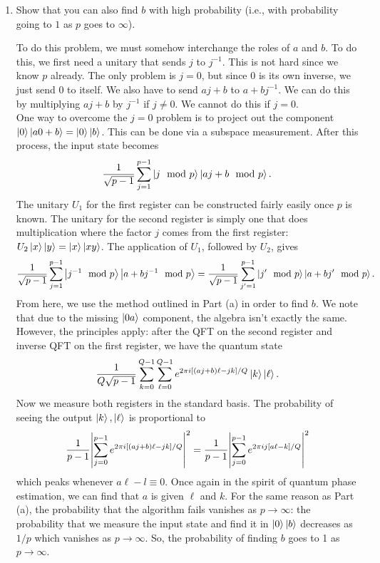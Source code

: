 \documentclass{article}
\theoremstyle{definition}
\newcommand{\f}[2]{\frac{#1}{#2}}
\begin{document}
\begin{enumerate}[label=(\alph*)]
\item Show that you can also find $b$ with high probability (i.e., with probability going to $1$ as $p$ goes to $\infty$). 

\noindent To do this problem, we must somehow interchange the roles of $a$ and $b$. To do this, we first need a unitary that sends $j$ to $j^{-1}$. This is not hard since we know $p$ already. The only problem is $j=0$, but since 0 is its own inverse, we just send $0$ to itself. We also have to send $aj+b$ to $a + bj^{-1}$. We can do this by multiplying $aj+b$ by $j^{-1}$ if $j\neq 0$. We cannot do this if $j=0$. \\

One way to overcome the $j=0$ problem is to project out the component $\ket{0} \ket{a 0 + b} = \ket{0}\ket{b}$. This can be done via a subspace measurement. After this process, the input state becomes
\begin{align*}
	\f{1}{\sqrt{p-1}}\sum_{j=1}^{p-1} \ket{j \mod p} \ket{aj + b \mod p}.
\end{align*}
The unitary $U_1$ for the first register can be constructed fairly easily once $p$ is known. The unitary for the second register is simply one that does multiplication where the factor $j$ comes from the first register: $U_2 \ket{x}\ket{y}= \ket{x}\ket{xy}$.  The application of $U_1$, followed by $U_2$, gives
\begin{align*}
		\f{1}{\sqrt{p-1}}\sum_{j=1}^{p-1} \ket{j^{-1} \mod p} \ket{a + b j^{-1} \mod p} = \f{1}{\sqrt{p-1}}\sum_{j'=1}^{p-1} \ket{j' \mod p} \ket{a + b j' \mod p}.
\end{align*}
From here, we use the method outlined in Part (a) in order to find $b$. We note that due to the missing $\ket{0a}$ component, the algebra isn't exactly the same. However, the principles apply: after the QFT on the second register and inverse QFT on the first register, we have the quantum state
\begin{align*}
	\f{1}{Q\sqrt{p-1}} \sum_{k=0}^{Q-1} \sum_{\ell = 0}^{Q-1} e^{2\pi i [(aj+b)\ell - jk]/Q} \ket{k} \ket{\ell}.
\end{align*}
Now we measure both registers in the standard basis. The probability of seeing the output $\ket{k}, \ket{\ell}$ is proportional to 
\begin{align*}
	\f{1}{p-1}\abs{\sum_{j=0}^{p-1} e^{2\pi i [ (aj+b)\ell - jk]  /Q }}^2 =  \f{1}{p-1}	\abs{\sum_{j=0}^{p-1} e^{2\pi i j [ a\ell - k]  /Q }}^2
\end{align*}
which peaks whenever $a\ell - l \equiv 0$. Once again in the spirit of quantum phase estimation, we can find that $a$ is given $\ell$ and $k$. For the same reason as Part (a), the probability that the algorithm fails vanishes as $p\to \infty$: the probability that we measure the input state and find it in $\ket{0}\ket{b}$ decreases as $1/p$ which vanishes as $p\to \infty$. So, the probability of finding $b$ goes to 1 as $p\to \infty$. 


\end{enumerate}
\end{document}
